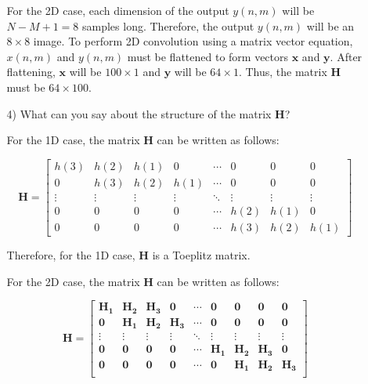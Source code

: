 \documentclass[fleqn]{article}
\begin{document}
\begin{enumerate}
\begin{enumerate}
			For the 2D case, each dimension of the output $y(n,m)$ will be $N - M + 1 = 8$ samples long. Therefore, the output $y(n,m)$ will be an $8 \times 8$ image. To perform 2D convolution using a matrix vector equation, $x(n,m)$ and $y(n,m)$ must be flattened to form vectors $\mathbf{x}$ and $\mathbf{y}$. After flattening, $\mathbf{x}$ will be $100 \times 1$ and $\mathbf{y}$ will be $64 \times 1$. Thus, the matrix $\mathbf{H}$ must be $64 \times 100$.
			
			\item[4)] What can you say about the structure of the matrix $\mathbf{H}$?
			
			For the 1D case, the matrix $\mathbf{H}$ can be written as follows:
			
			\begin{equation*}
				\mathbf{H} = \begin{bmatrix}
					h(3)   & h(2)   & h(1)   & 0      & \cdots & 0      & 0      & 0 \\
					0      & h(3)   & h(2)   & h(1)   & \cdots & 0      & 0      & 0 \\
					\vdots & \vdots & \vdots & \vdots & \ddots & \vdots & \vdots & \vdots \\
					0      & 0      & 0      & 0      & \cdots & h(2)   & h(1)   & 0 \\
					0      & 0      & 0      & 0      & \cdots & h(3)   & h(2)   & h(1)
				\end{bmatrix}
			\end{equation*}
				
			Therefore, for the 1D case, $\mathbf{H}$ is a Toeplitz matrix.
			
			For the 2D case, the matrix $\mathbf{H}$ can be written as follows:
			
			\begin{equation*}
				\mathbf{H} = \begin{bmatrix}
					\mathbf{H_1} & \mathbf{H_2} & \mathbf{H_3} & \mathbf{0}   & \cdots & \mathbf{0}   & \mathbf{0}   & \mathbf{0}   & \mathbf{0} \\
					\mathbf{0}   & \mathbf{H_1} & \mathbf{H_2} & \mathbf{H_3} & \cdots & \mathbf{0}   & \mathbf{0}   & \mathbf{0}   & \mathbf{0} \\
					\vdots       & \vdots       & \vdots       & \vdots       & \ddots & \vdots       & \vdots       & \vdots       & \vdots     \\
					\mathbf{0}   & \mathbf{0}   & \mathbf{0}   & \mathbf{0}   & \cdots & \mathbf{H_1} & \mathbf{H_2} & \mathbf{H_3} & \mathbf{0} \\
					\mathbf{0}   & \mathbf{0}   & \mathbf{0}   & \mathbf{0}   & \cdots & \mathbf{0}   & \mathbf{H_1} & \mathbf{H_2} & \mathbf{H_3} \\
				\end{bmatrix}
			\end{equation*}
			

\end{enumerate}
\end{enumerate}
\end{document}

